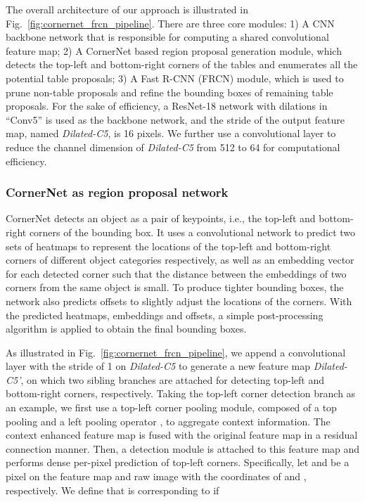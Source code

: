 \documentclass[final,3p,times,twocolumn]{elsarticle}
\begin{document}
The overall architecture of our approach is illustrated in Fig.~\ref{fig:cornernet_frcn_pipeline}. There are three core modules: 1) A CNN backbone network that is responsible for computing a shared convolutional feature map; 2) A CornerNet based region proposal generation module, which detects the top-left and bottom-right corners of the tables and enumerates all the potential table proposals; 3) A Fast R-CNN (FRCN) module, which is used to prune non-table proposals and refine the bounding boxes of remaining table proposals. For the sake of efficiency, a ResNet-18 network with dilations in “Conv5” is used as the backbone network, and the stride of the output feature map, named \textit{Dilated-C5}, is 16 pixels. We further use a  convolutional layer to reduce the channel dimension of \textit{Dilated-C5} from 512 to 64 for computational efficiency. 

\subsubsection{CornerNet as region proposal network}
\label{subsubsec:CornerNet_as_RPN}
CornerNet \cite{law2018cornernet} detects an object as a pair of keypoints, i.e., the top-left and bottom-right corners of the bounding box.  It uses a convolutional network to predict two sets of heatmaps to represent the locations of the top-left and bottom-right corners of different object categories respectively, as well as an embedding vector for each detected corner such that the distance between the embeddings of two corners from the same object is small. To produce tighter bounding boxes, the network also predicts offsets to slightly adjust the locations of the corners. With the predicted heatmaps, embeddings and offsets, a simple post-processing algorithm is applied to obtain the final bounding boxes. {}

As illustrated in Fig.~\ref{fig:cornernet_frcn_pipeline}, we append a  convolutional layer with the stride of 1 on \textit{Dilated-C5} to generate a new feature map \textit{Dilated-C5'}, on which two sibling branches are attached for detecting top-left and bottom-right corners, respectively. Taking the top-left corner detection branch as an example, we first use a top-left corner pooling module, composed of a top pooling and a left pooling operator \cite{law2018cornernet}, to aggregate context information. The context enhanced feature map is fused with the original feature map in a residual connection manner. Then, a detection module is attached to this feature map and performs dense per-pixel prediction of top-left corners. Specifically, let  and  be a pixel on the feature map and raw image with the coordinates of  and , respectively. We define that  is corresponding to  if
\end{document}
